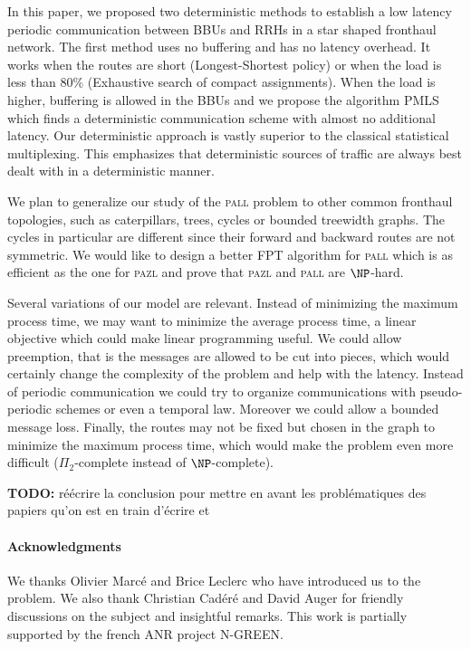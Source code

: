 \documentclass[10pt, conference, letterpaper]{IEEEtran}
\newcommand\pazl{\textsc{pazl}\xspace}
\newcommand\pall{\textsc{pall}\xspace}
\begin{document}
In this paper, we proposed two deterministic methods to establish a low latency periodic communication between BBUs and RRHs in a star shaped fronthaul network. The first method uses no buffering and has no latency overhead. It works when the routes are short (Longest-Shortest policy) or when the load is less than $80\%$ (Exhaustive search of compact assignments).  
When the load is higher, buffering is allowed in the BBUs and we propose the algorithm PMLS which finds a deterministic communication scheme with almost no additional latency.
 Our deterministic approach is vastly superior to the classical statistical multiplexing. This emphasizes that deterministic sources of traffic are always best dealt with in a deterministic manner.  

   
   We plan to generalize our study of the \pall problem to other common fronthaul topologies,
   such as caterpillars, trees, cycles or bounded treewidth graphs. The cycles in particular are different since their forward and backward routes are not symmetric. 
   We would like to design a better FPT algorithm for \pall which is as efficient as the one for \pazl and prove that \pazl and \pall are $\NP$-hard.

   Several variations of our model are relevant. Instead of minimizing the maximum process time, we may want to minimize the average process time, a linear objective which could make linear programming useful. We could allow preemption, that is the messages are allowed to be cut into pieces, which would certainly change the complexity of the problem and help with the latency.  Instead of periodic communication we could try to organize communications with pseudo-periodic schemes or even a temporal law. Moreover we could allow a bounded message loss. Finally, the routes may not be fixed but chosen in the graph to minimize the maximum process time, which would make the problem even more difficult ($\Pi_2$-complete instead of $\NP$-complete). 

  \textbf{TODO:} réécrire la conclusion pour mettre en avant les problématiques des papiers qu'on est en train d'écrire et 


 \paragraph*{Acknowledgments} 
 We thanks Olivier Marcé and Brice Leclerc who have introduced us to the problem.
 We also thank Christian Cad\'er\'e and David Auger for friendly discussions on the subject and insightful remarks. This work is partially supported by the french ANR project N-GREEN.



\end{document}
